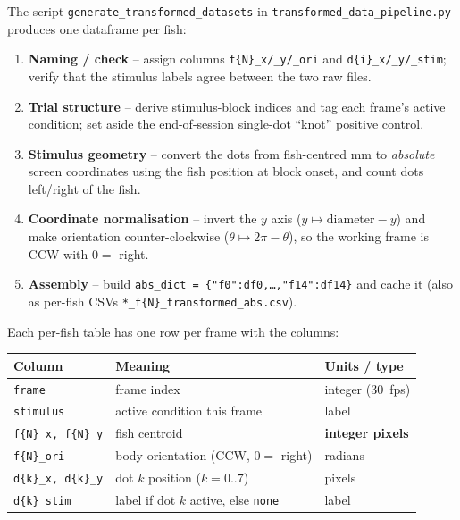 \documentclass[11pt]{article}
\begin{document}
The script \texttt{generate\_transformed\_datasets} in
\texttt{transformed\_data\_pipeline.py} produces one dataframe per fish:
\begin{enumerate}[nosep]
  \item \textbf{Naming / check} -- assign columns \texttt{f\{N\}\_x/\_y/\_ori} and
        \texttt{d\{i\}\_x/\_y/\_stim}; verify that the stimulus labels agree
        between the two raw files.
  \item \textbf{Trial structure} -- derive stimulus-block indices and tag each
        frame's active condition; set aside the end-of-session single-dot
        ``knot'' positive control.
  \item \textbf{Stimulus geometry} -- convert the dots from fish-centred mm to
        \emph{absolute} screen coordinates using the fish position at block
        onset, and count dots left/right of the fish.
  \item \textbf{Coordinate normalisation} -- invert the $y$ axis
        ($y\mapsto \text{diameter}-y$) and make orientation counter-clockwise
        ($\theta\mapsto 2\pi-\theta$), so the working frame is CCW with $0=$
        right.
  \item \textbf{Assembly} -- build
        \texttt{abs\_dict = \{"f0":df0,\dots,"f14":df14\}} and cache it (also as
        per-fish CSVs \texttt{*\_f\{N\}\_transformed\_abs.csv}).
\end{enumerate}

Each per-fish table has one row per frame with the columns:
\begin{table}[h]\centering\small
\begin{tabular}{@{}lll@{}}
\toprule
\textbf{Column} & \textbf{Meaning} & \textbf{Units / type}\\
\midrule
\texttt{frame}            & frame index                          & integer (30~fps)\\
\texttt{stimulus}         & active condition this frame          & label\\
\texttt{f\{N\}\_x, f\{N\}\_y} & fish centroid                    & \textbf{integer pixels}\\
\texttt{f\{N\}\_ori}      & body orientation (CCW, $0=$ right)   & radians\\
\texttt{d\{k\}\_x, d\{k\}\_y} & dot $k$ position ($k=0..7$)      & pixels\\
\texttt{d\{k\}\_stim}     & label if dot $k$ active, else \texttt{none} & label\\
\bottomrule
\end{tabular}
\end{table}
\end{document}
